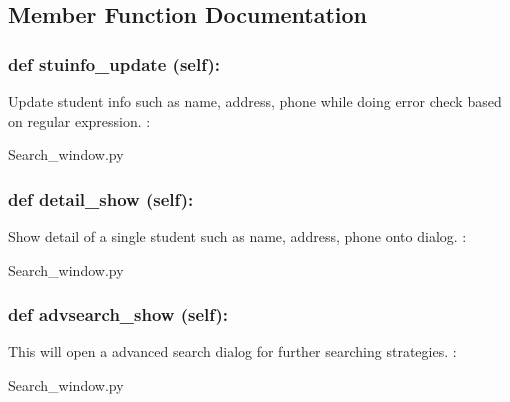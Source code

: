 \subsection{Member Function Documentation}

\hypertarget{class_poly_a14a7ad77ce612b0c54f531d307ee4b39}{
\subsubsection[{def stuinfo_update (self):}]{\setlength{\rightskip}{0pt plus 5cm}def {stuinfo\_update} (self):}}\label{class_poly_a14a7ad77ce612b0c54f531d307ee4b39}
Update student info such as name, address, phone while doing error check based on regular expression. 
:\begin{DoxyCompactItemize}
\item 
Search\_window.\-py\end{DoxyCompactItemize}

\hypertarget{class_poly_a14a7ad77ce612b0c54f531d307ee4b39}{
\subsubsection[{def detail_show (self):}]{\setlength{\rightskip}{0pt plus 5cm}def {detail\_show} (self):}}\label{class_poly_a14a7ad77ce612b0c54f531d307ee4b39}
Show detail of a single student such as name, address, phone onto dialog.
:\begin{DoxyCompactItemize}
\item 
Search\_window.\-py\end{DoxyCompactItemize}

\hypertarget{class_poly_a14a7ad77ce612b0c54f531d307ee4b39}{
\subsubsection[{def advsearch_show (self):}]{\setlength{\rightskip}{0pt plus 5cm}def {advsearch\_show} (self):}}\label{class_poly_a14a7ad77ce612b0c54f531d307ee4b39}
This will open a advanced search dialog for further searching strategies. 
:\begin{DoxyCompactItemize}
\item 
Search\_window.\-py\end{DoxyCompactItemize}

